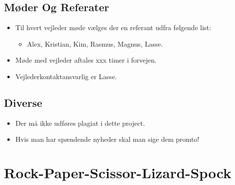 \documentclass{article}
\begin{document}
\subsection{Møder Og Referater}
\begin{itemize}
	\item Til hvert vejleder møde vælges der en referant udfra følgende list:
	\begin{itemize}
		\item Alex, Kristian, Kim, Rasmus, Magnus, Lasse.
	\end{itemize}
	\item Møde med vejleder aftales xxx timer i forvejen.
	\item Vejlederkontaktansvarlig er Lasse. 
\end{itemize}

\subsection{Diverse}
\begin{itemize}
	\item Der må ikke udføres plagiat i dette project.
	\item Hvis man har spændende nyheder skal man sige dem promto!
\end{itemize}

\appendix
\section{Rock-Paper-Scissor-Lizard-Spock}
\label{app:game}
\end{document}
